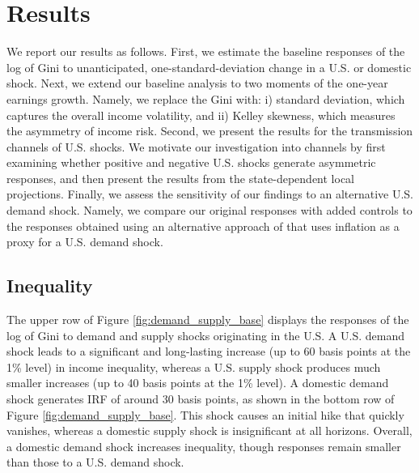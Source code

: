 \documentclass[12pt, a4paper]{article}
\begin{document}
\section{Results}
We report our results as follows. First, we estimate the baseline responses of the log of Gini to unanticipated, one-standard-deviation change in a U.S. or domestic shock. Next, we extend our baseline analysis to two moments of the one-year earnings growth. Namely, we replace the Gini with: i) standard deviation, which captures the overall income volatility, and ii) Kelley skewness, which measures the asymmetry of income risk. Second, we present the results for the transmission channels of U.S. shocks. We motivate our investigation into channels by first examining whether positive and negative U.S. shocks generate asymmetric responses, and then present the results from the state-dependent local projections. Finally, we assess the sensitivity of our findings to an alternative U.S. demand shock. Namely, we compare our original responses with added controls to the responses obtained using an alternative approach of \textcite{bayoumi1992shocking} that uses inflation as a proxy for a U.S. demand shock.


\subsection{Inequality}
The upper row of Figure \ref{fig:demand_supply_base} displays the responses of the log of Gini to demand and supply shocks originating in the U.S. A U.S. demand shock leads to a significant and long-lasting increase (up to 60 basis points at the 1\% level) in income inequality, whereas a U.S. supply shock produces much smaller increases (up to 40 basis points at the 1\% level). A domestic demand shock generates IRF of around 30 basis points, as shown in the bottom row of Figure \ref{fig:demand_supply_base}. This shock causes an initial hike that quickly vanishes, whereas a domestic supply shock is insignificant at all horizons. Overall, a domestic demand shock increases inequality, though responses remain smaller than those to a U.S. demand shock. 

\end{document}

